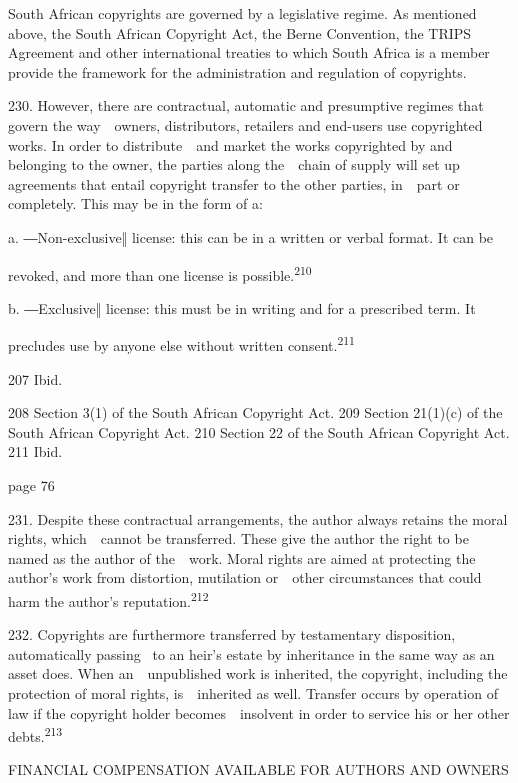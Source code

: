 \documentclass[
]{article}
\begin{document}
{South African copyrights are governed by a legislative regime. As
mentioned above, the South African }{Copyright Act}{, the }{Berne
Convention}{, the }{TRIPS Agreement }{and other international treaties
to which South Africa is a member provide the framework for the
administration and regulation of copyrights.}

{230. }{However, there are contractual, automatic and presumptive
regimes that govern the way~~owners, distributors, retailers and
end-users use copyrighted works. In order to distribute~~and market the
works copyrighted by and belonging to the owner, the parties along
the~~chain of supply will set up agreements that entail copyright
transfer to the other parties, in~~part or completely. This may be in
the form of a:}

{a. }{―Non}{-}{exclusive‖ license: this can be in a written or verbal
format}{. It can be}

{revoked, and more than one license is possible.}\textsuperscript{{210}}

{b. }{―Exclusive‖ license: this must be in writing and for a prescribed
term}{. It}

{precludes use by anyone else without written
consent.}\textsuperscript{{211}}

{207 }{Ibid}{.}

{208 }{Section 3(1) of the South African }{Copyright Act}{. }{209
}{Section 21(1)(c) of the South African }{Copyright Act}{. }{210
}{Section 22 of the South African }{Copyright Act}{. }{211 }{Ibid}{.}

{page 76}

{231. }{Despite these contractual arrangements, the author always
retains the moral rights, which~~cannot be transferred. These give the
author the right to be named as the author of the~~work. Moral rights
are aime}{d at protecting the author's work from distortion, mutilation
or~~other circumstances that could harm the author's
reputation.}\textsuperscript{{212}}

{232. }{Copyrights are furthermore transferred by testamentary
disposition, automatically passing }{~to an heir's estate by inheritance
in }{the same way as an asset does. When an~~unpublished work is
inherited, the copyright, including the protection of moral rights,
is~~inherited as well. Transfer occurs by operation of law if the
copyright holder becomes~~insolvent in order to service his or her other
debts.}\textsuperscript{{213}}

{FINANCIAL COMPENSATION AVAILABLE FOR AUTHORS AND OWNERS}
\end{document}
